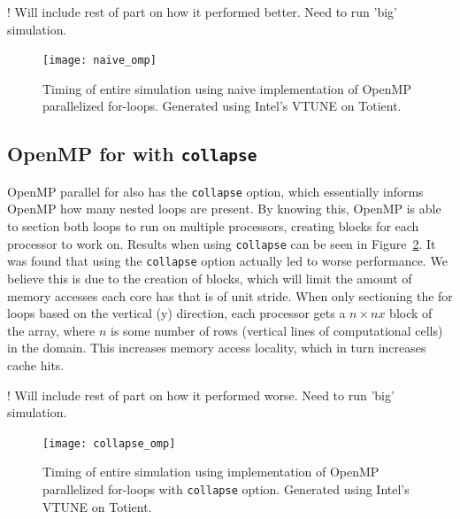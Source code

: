 \documentclass[12pt]{article}
\begin{document}
		! Will include rest of part on how it performed better. Need to run 'big' simulation.
		
		\begin{figure}[h]
			\begin{center}
				\texttt{[image: naive\_omp]}
				\caption{Timing of entire simulation using naive implementation of OpenMP parallelized for-loops. Generated using Intel's VTUNE on Totient.}
				\label{naive_omp}
			\end{center}
		\end{figure}
		
		\subsection{OpenMP for with \texttt{collapse}}
		OpenMP parallel for also has the \texttt{collapse} option, which essentially informs OpenMP how many nested loops are present. By knowing this, OpenMP is able to section both loops to run on multiple processors, creating blocks for each processor to work on. Results when using \texttt{collapse} can be seen in Figure~\ref{collapse_omp}. It was found that using the \texttt{collapse} option actually led to worse performance. We believe this is due to the creation of blocks, which will limit the amount of memory accesses each core has that is of unit stride. When only sectioning the for loops based on the vertical (y) direction, each processor gets a $n \times nx$ block of the array, where $n$ is some number of rows (vertical lines of computational cells) in the domain. This increases memory access locality, which in turn increases cache hits.
			
		! Will include rest of part on how it performed worse. Need to run 'big' simulation.
			
		\begin{figure}[h]
			\begin{center}
				\texttt{[image: collapse\_omp]}
				\caption{Timing of entire simulation using implementation of OpenMP parallelized for-loops with \texttt{collapse} option. Generated using Intel's VTUNE on Totient.}
				\label{collapse_omp}
			\end{center}
		\end{figure}
\FloatBarrier
	
	
	
\end{document}
